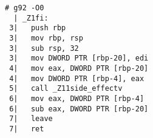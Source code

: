 \begin{lstlisting}[language={},numbers=none,title=\href{https://godbolt.org/z/5xq5n5}{\texttt{godbolt.org/z/5xq5n5}}]
# g92 -O0
  | _Z1fi:
 3|   push rbp
 3|   mov rbp, rsp
 3|   sub rsp, 32
 3|   mov DWORD PTR [rbp-20], edi
 4|   mov eax, DWORD PTR [rbp-20]
 4|   mov DWORD PTR [rbp-4], eax
 5|   call _Z11side_effectv
 6|   mov eax, DWORD PTR [rbp-4]
 6|   sub eax, DWORD PTR [rbp-20]
 7|   leave
 7|   ret
\end{lstlisting}
